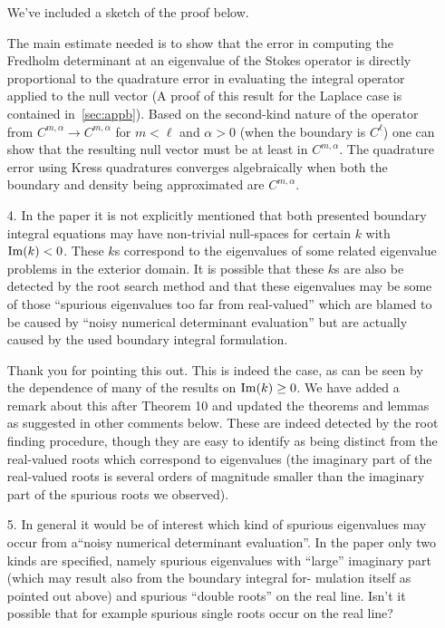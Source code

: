 \documentclass{article}
\begin{document}
\begin{itemize}
We've included a sketch of the proof below. 

The main estimate needed is to show that the error in computing
the Fredholm determinant at an eigenvalue of the Stokes operator
is directly proportional to the quadrature error in 
evaluating the integral operator applied to the null vector (A proof of this result for the 
Laplace case is contained in~\cref{sec:appb}). 
Based on the second-kind nature of the operator from $C^{m,\alpha} \to C^{m,\alpha}$
for $m<\ell$ and $\alpha>0$ (when the boundary is $C^{\ell}$) one can show
that the resulting null vector must be at least in $C^{m,\alpha}$.
The quadrature error using Kress quadratures converges algebraically
when both the boundary and density being approximated are $C^{m,\alpha}$. 

\item[4.] {\color{blue} In the paper it is not explicitly mentioned that
  both presented boundary integral equations may have non-trivial null-spaces
  for certain $k$ with ${\rm Im}(k) < 0$. These $k$s correspond to the eigenvalues of some
  related eigenvalue problems in the exterior domain. It is possible that
  these $k$s are also be detected by the root search method and that these
  eigenvalues may be some of those “spurious eigenvalues too far from
  real-valued” which are blamed to be caused by “noisy numerical determinant
  evaluation” but are actually caused by the used boundary integral formulation.}

Thank you for pointing this out. This is indeed the case, as can be seen
by the dependence of many of the results on ${\rm Im}(k) \geq 0$. We have
added a remark about this after Theorem 10 and updated the theorems and lemmas
as suggested in other comments below. These are indeed detected by the
root finding procedure, though they are easy to identify as
being distinct from the real-valued roots which correspond to
eigenvalues (the imaginary part of the real-valued roots is several
orders of magnitude smaller than the imaginary part of the
spurious roots we observed).

\item[5.] {\color{blue}
  In general it would be of interest which kind of spurious eigenvalues may
occur from a“noisy numerical determinant evaluation”. In the paper
only two kinds are specified, namely spurious eigenvalues with “large”
imaginary part (which may result also from the boundary integral for-
mulation itself as pointed out above) and spurious “double roots” on
the real line. Isn’t it possible that for example spurious single roots
occur on the real line?}


\end{itemize}
\end{document}

